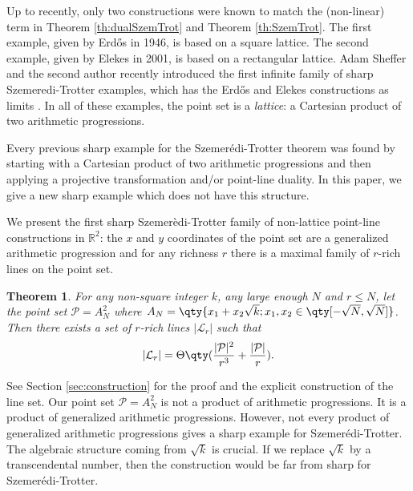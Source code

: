 \documentclass[11pt]{article}
\newtheorem{theorem}{Theorem}[section]
\newcommand{\parag}[1]{\vspace{2mm}

\noindent{\bf #1} }
\newcommand{\RR}{\ensuremath{\mathbb R}}
\newcommand{\pts}{\mathcal P}
\newcommand{\lines}{\mathcal L}
\begin{document}
Up to recently, only two constructions were known to match the (non-linear) term in Theorem \ref{th:dualSzemTrot} and Theorem \ref{th:SzemTrot}.  The first example, given by Erd\H{o}s in 1946, is based on a square lattice.  The second example, given by Elekes \cite{Elek02} in 2001, is based on a rectangular lattice. Adam Sheffer and the second author recently introduced the first infinite family of sharp Szemeredi-Trotter examples, which has the Erd\H{o}s and Elekes constructions as limits \cite{ShefferSilier}. In all of these examples, the point set is a \textit{lattice}: a Cartesian product of two arithmetic progressions.

Every previous sharp example for the Szemer\'edi-Trotter theorem was found by starting with a Cartesian product of two arithmetic progressions and then applying a projective transformation and/or point-line duality.  In this paper, we give a new sharp example which does not have this structure.  


\parag{Our family of constructions.}

We present the first sharp Szemer\`edi-Trotter family of non-lattice point-line constructions in $\RR^2$: the $x$ and $y$ coordinates of the point set are a generalized arithmetic progression and for any richness $r$ there is a maximal family of $r$-rich lines on the point set. 

\begin{theorem} \label{th:construction}
For any non-square integer $k$, any large enough $N$ and $r \leq N$, let the point set $\pts=A_N^2$ where $A_N = \qty{ x_1 + x_2 \sqrt{k} ; x_1,x_2 \in \qty[-\sqrt{N},\sqrt{N}]}$. Then there exists a set of $r$-rich lines $|\lines_r|$ such that 
%
\[ |\lines_r| = \Theta\qty(\frac{|\pts|^2}{r^3} + \frac{|\pts|}{r}). \]
%
\end{theorem}

See Section  \ref{sec:construction} for the proof and the explicit construction of the line set. 
Our point set $\pts = A_N^2$ is not a product of arithmetic progressions.  It is a product of generalized arithmetic progressions.  However, not every product of generalized arithmetic progressions gives a sharp example for Szemer\'edi-Trotter.  The algebraic structure coming from $\sqrt{k}$ is crucial.  If we replace $\sqrt{k}$ by a transcendental number, then the construction would be far from sharp for Szemer\'edi-Trotter.  

\end{document}
